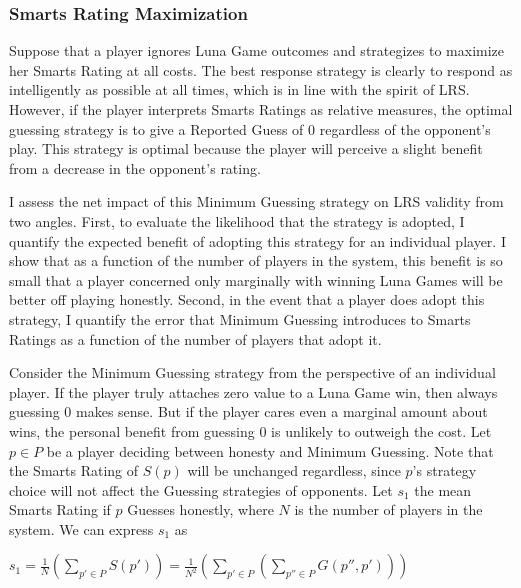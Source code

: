 \subsubsection{Smarts Rating Maximization}

Suppose that a player ignores Luna Game outcomes and strategizes to maximize her Smarts Rating at all costs. The best response strategy is clearly to respond as intelligently as possible at all times, which is in line with the spirit of LRS. However, if the player interprets Smarts Ratings as relative measures, the optimal guessing strategy is to give a Reported Guess of 0 regardless of the opponent's play. This strategy is optimal because the player will perceive a slight benefit from a decrease in the opponent's rating. 

I assess the net impact of this Minimum Guessing strategy on LRS validity from two angles. First, to evaluate the likelihood that the strategy is adopted, I quantify the expected benefit of adopting this strategy for an individual player. I show that as a function of the number of players in the system, this benefit is so small that a player concerned only marginally with winning Luna Games will be better off playing honestly. Second, in the event that a player does adopt this strategy, I quantify the error that Minimum Guessing introduces to Smarts Ratings as a function of the number of players that adopt it.

Consider the Minimum Guessing strategy from the perspective of an individual player. If the player truly attaches zero value to a Luna Game win, then always guessing 0 makes sense. But if the player cares even a marginal amount about wins, the personal benefit from guessing 0 is unlikely to outweigh the cost. Let $p \in P$ be a player deciding between honesty and Minimum Guessing. Note that the Smarts Rating of $S(p)$ will be unchanged regardless, since $p$'s strategy choice will not affect the Guessing strategies of opponents. Let $s_1$ the mean Smarts Rating if $p$ Guesses honestly, where $N$ is the number of players in the system. We can express $s_1$ as
\begin{center}
\begin{math}
s_1 = \frac{1}{N}(\sum_{p' \in P}S(p')) = \frac{1}{N^2}(\sum_{p' \in P}(\sum_{p'' \in P}G(p'', p')))
\end{math}
\end{center}

